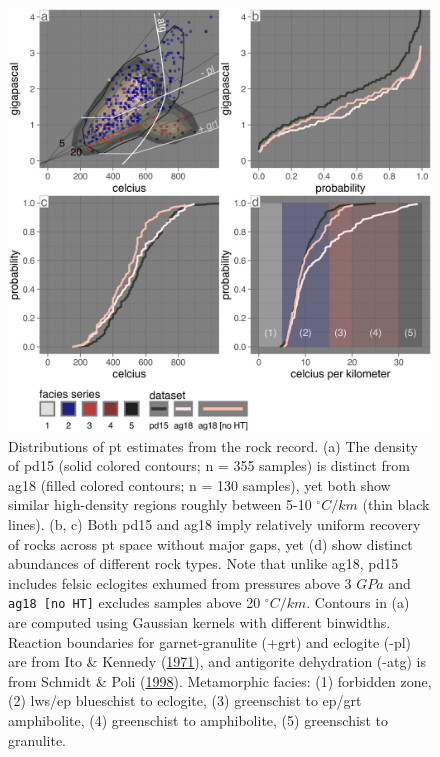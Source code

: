 \begin{figure}[htbp]

{\centering \includegraphics[width=1\linewidth,]{assets/figs/chpt4/rox_comp} 

}

\caption[Compiled \gls{pt} estimates from the rock record]{Distributions of \gls{pt} estimates from the rock record. (a) The density of pd15 (solid colored contours; n = 355 samples) is distinct from ag18 (filled colored contours; n = 130 samples), yet both show similar high-density regions roughly between 5-10 \(^\circ C/km\) (thin black lines). (b, c) Both pd15 and ag18 imply relatively uniform recovery of rocks across \gls{pt} space without major gaps, yet (d) show distinct abundances of different rock types. Note that unlike ag18, pd15 includes felsic eclogites exhumed from pressures above 3 \(GPa\) and \texttt{ag18\ {[}no\ HT{]}} excludes samples above 20 \(^\circ C/km\). Contours in (a) are computed using Gaussian kernels with different binwidths. Reaction boundaries for garnet-granulite (+grt) and eclogite (-pl) are from Ito \& Kennedy (\protect\hyperlink{ref-ito1971}{1971}), and antigorite dehydration (-atg) is from Schmidt \& Poli (\protect\hyperlink{ref-schmidt1998}{1998}). Metamorphic facies: (1) forbidden zone, (2) lws/ep blueschist to eclogite, (3) greenschist to ep/grt amphibolite, (4) greenschist to amphibolite, (5) greenschist to granulite.}\label{fig:rockPTComp}
\end{figure}

